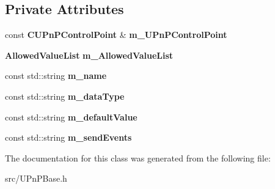 \subsection*{Private Attributes}
\begin{DoxyCompactItemize}
\item 
const {\bf CUPnPControlPoint} \& {\bfseries m\_\-UPnPControlPoint}\label{classCUPnPStateVariable_a6726f5bddb19a91171fe230dc0173a35}

\item 
{\bf AllowedValueList} {\bfseries m\_\-AllowedValueList}\label{classCUPnPStateVariable_a1dc0cb87398d84091e94cde083f81134}

\item 
const std::string {\bfseries m\_\-name}\label{classCUPnPStateVariable_a3e62c274e08a5e46611bfca100b62288}

\item 
const std::string {\bfseries m\_\-dataType}\label{classCUPnPStateVariable_a85189e3b3ed5e609dc085517a03f55de}

\item 
const std::string {\bfseries m\_\-defaultValue}\label{classCUPnPStateVariable_a7a1a328aeb7683a79980ae204029d582}

\item 
const std::string {\bfseries m\_\-sendEvents}\label{classCUPnPStateVariable_aa3570da7d77c05788cc3a4a3b40b4574}

\end{DoxyCompactItemize}


The documentation for this class was generated from the following file:\begin{DoxyCompactItemize}
\item 
src/UPnPBase.h\end{DoxyCompactItemize}
